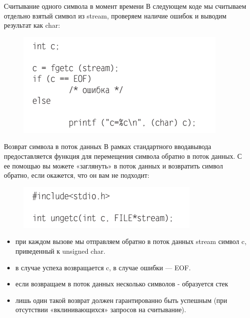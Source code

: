 \documentclass{beamer}
\begin{document}
\begin{frame}{Считывание одного символа в момент времени}
В следующем коде мы считываем отдельно взятый символ из stream, проверяем наличие ошибок и выводим результат как char:
\begin{figure}[h]
\centering
\includegraphics[scale=0.5]{images/lec05-pic11.png}
\end{figure}
\end{frame}

\begin{frame}{Возврат символа в поток данных}
 В рамках стандартного ввода­вывода предоставляется функция для перемещения символа обратно в поток данных. С ее помощью вы можете «заглянуть» в поток данных и возвратить символ обратно, если окажется, что он вам не подходит:
\begin{figure}[h]
\centering
\includegraphics[scale=0.5]{images/lec05-pic12.png}
\end{figure}
\begin{itemize}
\item при каждом вызове мы отправляем обратно в поток данных stream символ c, приведенный к unsigned char. 
\item в случае успеха возвращается c, в случае ошибки — EOF.
\item если возвращаем в поток данных несколько символов - образуется стек
\item лишь один такой возврат должен гарантированно быть успешным (при отсутствии «вклинивающихся» запросов на считывание).
\end{itemize}
\end{frame}
\end{document}
